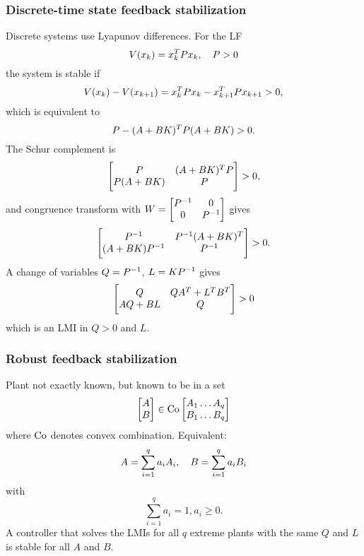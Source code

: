 \subsubsection{Discrete-time state feedback stabilization}
Discrete systems use Lyapunov differences. For the LF
%
\begin{equation}
  V(x_k) = x_k^{T} P x_k,\quad P>0
\end{equation}
%
the system is stable if
%
\begin{equation}
  V(x_k) - V(x_{k+1}) = x_k^{T} P x_k - x_{k+1}^{T} P x_{k+1} > 0,
\end{equation}
%
which is equivalent to
%
\begin{equation}
  P - (A + BK)^{T} P (A+BK) > 0.
\end{equation}
%
The Schur complement is
%
\begin{equation}
  \begin{bmatrix}
    P & (A + BK)^{T} P \\
    P(A + BK) & P
  \end{bmatrix}
  > 0,
\end{equation}
%
and congruence transform with $W = \begin{bmatrix} P^{-1} & 0 \\ 0 & P^{-1} \end{bmatrix}$ gives
%
\begin{equation}
  \begin{bmatrix}
    P^{-1} & P^{-1} (A + BK)^{T} \\
    (A + BK) P^{-1} & P^{-1}
  \end{bmatrix}
  > 0.
\end{equation}
%
A change of variables $Q = P^{-1}$, $L = KP^{-1}$ gives
%
\begin{equation}
  \begin{bmatrix}
    Q & QA^{T} + L^{T} B^{T} \\
    AQ + BL & Q
  \end{bmatrix}
  > 0
\end{equation}
%
which is an LMI in $Q > 0$ and $L$.

\subsubsection{Robust feedback stabilization}
Plant not exactly known, but known to be in a set
%
\begin{equation}
  \begin{bmatrix} A \\ B \end{bmatrix} \in \operatorname{Co} \begin{bmatrix} A_1 \dots A_q \\ B_1 \dots B_q \end{bmatrix}
\end{equation}
%
where $\operatorname{Co}$ denotes convex combination. Equivalent:
%
\begin{equation}
    A = \sum_{i=1}^q a_i A_i,\quad B = \sum_{i=1}^q a_i B_i \\
\end{equation}
%
with
%
\begin{equation}
  \sum_{i=1}^q a_i = 1, a_i \geq 0.
\end{equation}
%
A controller that solves the LMIs for all $q$ extreme plants with the same $Q$ and $L$ is stable for all $A$ and $B$.

